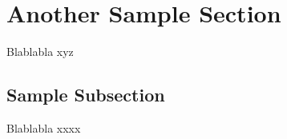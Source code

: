 \section{Another Sample Section}
\label{intro:another_sample_section}

Blablabla \gls{xyz}

\subsection{Sample Subsection}
Blablabla xxxx
